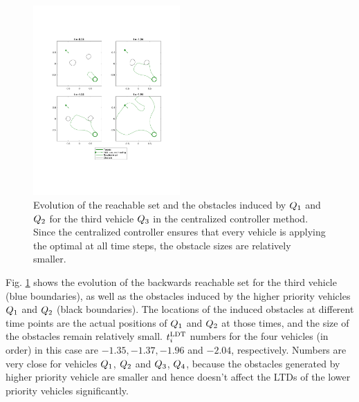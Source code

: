 \begin{figure}
  \centering
  \includegraphics[width=0.5\textwidth]{"fig/cc_rs3"}
  \caption{Evolution of the reachable set and the obstacles induced by $Q_1$ and $Q_2$ for the third vehicle $Q_3$ in the centralized controller method. Since the centralized controller ensures that every vehicle is applying the optimal at all time steps, the obstacle sizes are relatively smaller.}
  \label{fig:cc_rs3}
\end{figure}

Fig. \ref{fig:cc_rs3} shows the evolution of the backwards reachable set for the third vehicle (blue boundaries), as well as the obstacles induced by the higher priority vehicles $Q_1$ and $Q_2$ (black boundaries). The locations of the induced obstacles at different time points are the actual positions of $Q_1$ and $Q_2$ at those times, and the size of the obstacles remain relatively small. $t^\text{LDT}_i$ numbers for the four vehicles (in order) in this case are $-1.35, -1.37, -1.96$ and $-2.04$, respectively. Numbers are very close for vehicles $Q_1$, $Q_2$ and $Q_3$, $Q_4$, because the obstacles generated by higher priority vehicle are smaller and hence doesn't affect the LTDs of the lower priority vehicles significantly. 

